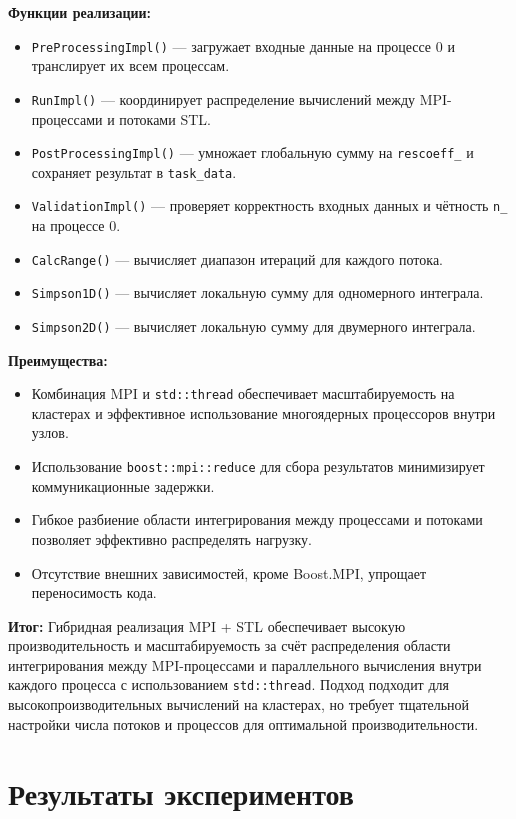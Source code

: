 \documentclass[12pt]{article}
\begin{document}
\textbf{Функции реализации:}
\begin{itemize}
  \item \texttt{PreProcessingImpl()} --- загружает входные данные на процессе 0 и транслирует их всем процессам.
  \item \texttt{RunImpl()} --- координирует распределение вычислений между MPI-процессами и потоками STL.
  \item \texttt{PostProcessingImpl()} --- умножает глобальную сумму на \texttt{rescoeff\_} и сохраняет результат в \texttt{task\_data}.
  \item \texttt{ValidationImpl()} --- проверяет корректность входных данных и чётность \texttt{n\_} на процессе 0.
  \item \texttt{CalcRange()} --- вычисляет диапазон итераций для каждого потока.
  \item \texttt{Simpson1D()} --- вычисляет локальную сумму для одномерного интеграла.
  \item \texttt{Simpson2D()} --- вычисляет локальную сумму для двумерного интеграла.
\end{itemize}

\textbf{Преимущества:}
\begin{itemize}
  \item Комбинация MPI и \texttt{std::thread} обеспечивает масштабируемость на кластерах и эффективное использование многоядерных процессоров внутри узлов.
  \item Использование \texttt{boost::mpi::reduce} для сбора результатов минимизирует коммуникационные задержки.
  \item Гибкое разбиение области интегрирования между процессами и потоками позволяет эффективно распределять нагрузку.
  \item Отсутствие внешних зависимостей, кроме Boost.MPI, упрощает переносимость кода.
\end{itemize}

\textbf{Итог:} Гибридная реализация MPI + STL обеспечивает высокую производительность и масштабируемость за счёт распределения области интегрирования между MPI-процессами и параллельного вычисления внутри каждого процесса с использованием \texttt{std::thread}. Подход подходит для высокопроизводительных вычислений на кластерах, но требует тщательной настройки числа потоков и процессов для оптимальной производительности.

\section{Результаты экспериментов}
\end{document}

